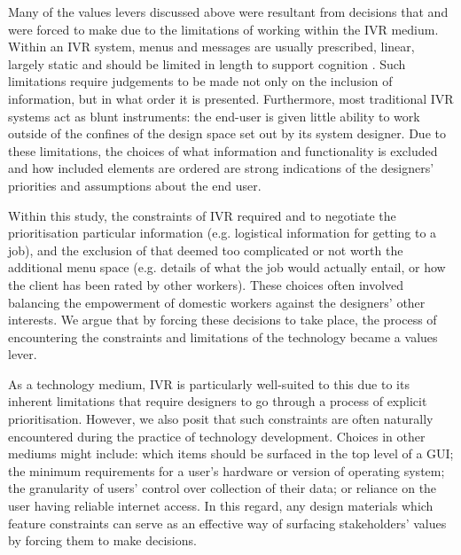 Many of the values levers discussed above were resultant from decisions that \PC{} and \NGO{} were forced to make due to the limitations of working within the IVR medium. Within an IVR system, menus and messages are usually prescribed, linear, largely static and should be limited in length to support cognition \cite{Suhm2008}. Such limitations require judgements to be made not only on the inclusion of information, but in what order it is presented. Furthermore, most traditional IVR systems act as blunt instruments: the end-user is given little ability to work outside of the confines of the design space set out by its system designer. Due to these limitations, the choices of what information and functionality is excluded and how included elements are ordered are strong indications of the designers' priorities and assumptions about the end user.

Within this study, the constraints of IVR required \PC{} and \NGO{} to negotiate the prioritisation particular information (e.g. logistical information for getting to a job), and the exclusion of that deemed too complicated or not worth the additional menu space (e.g. details of what the job would actually entail, or how the client has been rated by other workers). These choices often involved balancing the empowerment of domestic workers against the designers' other interests. We argue that by forcing these decisions to take place, the process of encountering the constraints and limitations of the technology became a values lever. 

As a technology medium, IVR is particularly well-suited to this due to its inherent limitations that require designers to go through a process of explicit prioritisation. However, we also posit that such constraints are often naturally encountered during the practice of technology development. Choices in other mediums might include: which items should be surfaced in the top level of a GUI; the minimum requirements for a user's hardware or version of operating system; the granularity of users' control over collection of their data; or reliance on the user having reliable internet access. In this regard, any design materials which feature constraints can serve as an effective way of surfacing stakeholders' values by forcing them to make decisions. 

